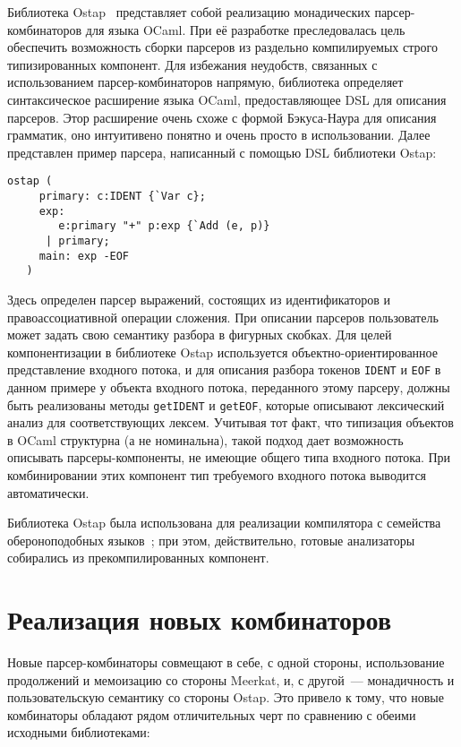 \documentclass[conference]{IEEEtran}
\begin{document}
Библиотека Ostap~\cite{ostap} представляет собой реализацию монадических парсер-комбинаторов для языка OCaml. При её разработке преследовалась цель обеспечить возможность
сборки парсеров из раздельно компилируемых строго типизированных компонент. Для избежания неудобств, связанных с использованием парсер-комбинаторов напрямую, библиотека определяет
синтаксическое расширение языка OCaml, предоставляющее DSL для описания парсеров. Этор расширение очень схоже с формой Бэкуса-Наура для описания грамматик, оно интуитивено понятно
и очень просто в использовании. Далее представлен пример парсера, написанный с помощью DSL библиотеки Ostap:

\begin{lstlisting}[basicstyle=\small]
   ostap (
     primary: c:IDENT {`Var c};
     exp:
        e:primary "+" p:exp {`Add (e, p)}
      | primary;
     main: exp -EOF
   )
\end{lstlisting}

Здесь определен парсер выражений, состоящих из идентификаторов и правоассоциативной операции сложения. При описании парсеров пользователь может задать свою семантику разбора в фигурных скобках.
Для целей компонентизации в библиотеке Ostap используется объектно-ориентированное представление входного потока, и для описания разбора токенов \lstinline|IDENT| и \lstinline|EOF| в данном
примере у объекта входного потока, переданного этому парсеру, должны быть реализованы методы \lstinline|getIDENT| и \lstinline|getEOF|, которые описывают лексический анализ для соответствующих
лексем. Учитывая тот факт, что типизация объектов в OCaml структурна (а не номинальна), такой подход дает возможность описывать парсеры-компоненты, не имеющие общего типа входного потока.
При комбинировании этих компонент тип требуемого входного потока выводится автоматически.

Библиотека Ostap была использована для реализации компилятора с семейства обероноподобных языков~\cite{boulytchev2015combinators}; при этом, действительно, готовые анализаторы собирались из
прекомпилированных компонент.

\section{Реализация новых комбинаторов}

Новые парсер-комбинаторы совмещают в себе, с одной стороны, использование продолжений и мемоизацию со стороны Meerkat, и, с другой~--- монадичность и пользовательскую семантику со стороны Ostap.
Это привело к тому, что новые комбинаторы обладают рядом отличительных черт по сравнению с обеими исходными библиотеками:
\end{document}

